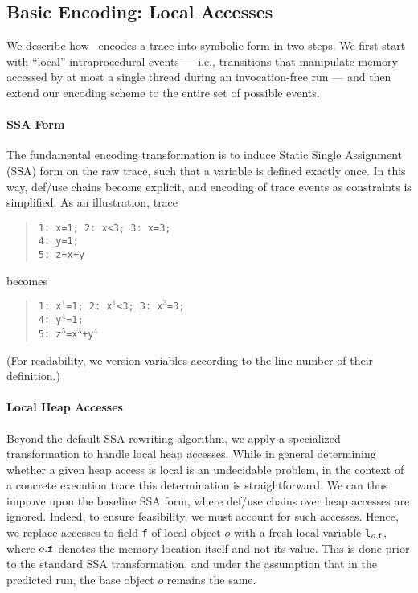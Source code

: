 \subsection{Basic Encoding: Local Accesses}

We describe how \tool\ encodes a trace into symbolic form in two steps. We first start with ``local'' intraprocedural events --- i.e., 
transitions that manipulate memory accessed by at most a single thread during an invocation-free run --- and then extend our encoding scheme to the entire set of possible events.

\paragraph{SSA Form} The fundamental encoding transformation is to induce Static Single Assignment (SSA) form on the raw trace, such that
a variable is defined exactly once. In this way, def/use chains become explicit, and encoding of trace events as constraints is simplified. As an illustration, trace
\begin{quote}
	{\tt 1: x=1; 2: x<3; 3: x=3;} \\
	{\tt 4: y=1;} \\
	{\tt 5: z=x+y}
\end{quote}
becomes
\begin{quote}
	{\tt 1: x$^1$=1; 2: x$^1$<3; 3: x$^3$=3;} \\
	{\tt 4: y$^4$=1;} \\
	{\tt 5: z$^5$=x$^3$+y$^4$}
\end{quote}
(For readability, we version variables according to the line number of their definition.)

\paragraph{Local Heap Accesses} Beyond the default SSA rewriting algorithm, we apply a specialized transformation to handle local heap accesses. While in general determining whether a given heap access is local is an undecidable problem, in the context
of a concrete execution trace this determination is straightforward. We can thus improve upon the baseline SSA form, where def/use chains over heap accesses are ignored. Indeed, to ensure feasibility, we must account for such accesses. Hence, we replace accesses to field {\tt f} of local object $o$ with a fresh local variable {\tt l$_{o{\tt .f}}$}, where $o{\tt .f}$ denotes the memory location itself and not its value. This is done prior to the standard SSA transformation, and under the assumption that in the predicted run, the base object $o$ remains the same.

